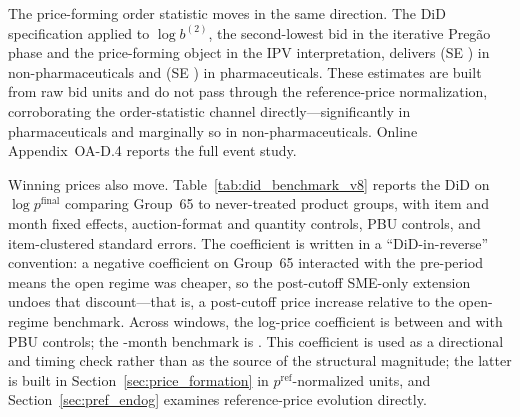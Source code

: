The price-forming order statistic moves in the same direction. The DiD
specification applied to $\log b^{(2)}$, the second-lowest bid in the
iterative Preg\~ao phase and the price-forming object in the IPV
interpretation, delivers \bidSecondDidEstNp{} (SE \bidSecondDidSeNp{}) in
non-pharmaceuticals and \bidSecondDidEstPh{} (SE \bidSecondDidSePh{}) in
pharmaceuticals. These estimates are built from raw bid units and do not
pass through the reference-price normalization, corroborating the
order-statistic channel directly---significantly in pharmaceuticals and
marginally so in non-pharmaceuticals. Online Appendix~OA-D.4 reports the
full event study.

Winning prices also move. Table~\ref{tab:did_benchmark_v8} reports the DiD
on $\log p^{\mathrm{final}}$ comparing Group~65 to never-treated product
groups, with item and month fixed effects, auction-format and quantity
controls, PBU controls, and item-clustered standard errors. The
coefficient is written in a ``DiD-in-reverse'' convention: a negative
coefficient on Group~65 interacted with the pre-period means the open
regime was cheaper, so the post-cutoff SME-only extension undoes that
discount---that is, a post-cutoff price increase relative to the
open-regime benchmark. Across
windows, the log-price coefficient is between \didPriceTwelvePbu{} and
\didPriceSixPbu{} with PBU controls; the \structuralWindowM-month
benchmark is \didPriceEighteenPbu{}. This coefficient is used as a directional and
timing check rather than as the source of the structural magnitude; the
latter is built in Section~\ref{sec:price_formation} in
$p^{\mathrm{ref}}$-normalized units, and Section~\ref{sec:pref_endog}
examines reference-price evolution directly.

